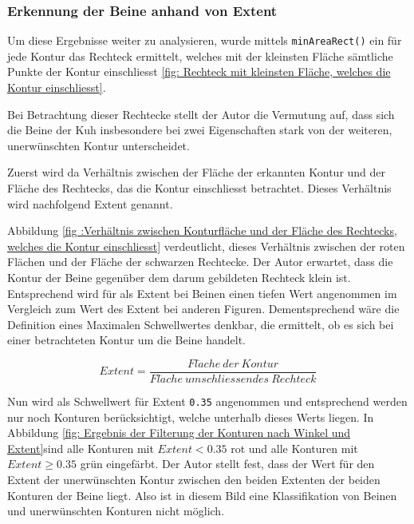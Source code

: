 \subsubsection{Erkennung der Beine anhand von Extent}
Um diese Ergebnisse weiter zu analysieren, wurde mittels \texttt{minAreaRect()} ein für jede Kontur das Rechteck ermittelt, welches mit der kleinsten Fläche sämtliche Punkte der Kontur einschliesst \ref{fig: Rechteck mit kleinsten Fläche, welches die Kontur einschliesst}.  


Bei Betrachtung dieser Rechtecke stellt der Autor die Vermutung auf, dass sich die Beine der Kuh insbesondere bei zwei Eigenschaften stark von der weiteren, unerwünschten Kontur unterscheidet. 



Zuerst wird da Verhältnis zwischen der Fläche der erkannten Kontur und der Fläche des Rechtecks, das die Kontur einschliesst betrachtet. Dieses Verhältnis wird nachfolgend Extent genannt.


Abbildung \ref{fig :Verhältnis zwischen Konturfläche und der Fläche des Rechtecks, welches die Kontur einschliesst} verdeutlicht, dieses Verhältnis zwischen der roten Flächen und der Fläche der schwarzen Rechtecke.  Der Autor erwartet, dass die Kontur der Beine gegenüber dem darum gebildeten Rechteck klein ist. Entsprechend wird für als Extent bei Beinen einen tiefen Wert angenommen im Vergleich zum Wert des Extent bei anderen Figuren. Dementsprechend wäre die Definition eines Maximalen Schwellwertes denkbar, die ermittelt, ob es sich bei einer betrachteten Kontur um die Beine handelt. 



\begin{equation}\label{Extent}
Extent =  \frac{Fl\ddot{a}che\ der\ Kontur}{Fl\ddot{a}che\  umschliessendes\  Rechteck}  
\end{equation}

Nun wird als Schwellwert für Extent \texttt{0.35} angenommen und entsprechend werden nur noch Konturen berücksichtigt, welche unterhalb dieses Werts liegen. In Abbildung \ref{fig: Ergebnis der Filterung der Konturen nach Winkel und Extent}sind alle Konturen mit ${Extent < 0.35}$ rot und alle Konturen mit $Extent \geq 0.35 $ grün eingefärbt. Der Autor stellt fest, dass der Wert für den Extent der unerwünschten Kontur zwischen den beiden Extenten der beiden Konturen der Beine liegt. Also ist in diesem Bild eine Klassifikation von Beinen und unerwünschten Konturen nicht möglich. 




